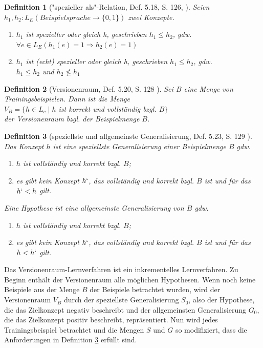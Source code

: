 \documentclass[a4paper, 11pt]{book}
\newtheorem{Def}{Definition }[section]
\begin{document}
{\begin{Def}["{}spezieller als"{}-Relation, Def. 5.18, S. 126, \cite{BKI08}]
	Seien $ h_1, h_2 : L_E (Beispielsprache \rightarrow \{0,1\}) $ zwei Konzepte.
	\begin{enumerate}
		\item $ h_1 $ ist spezieller oder gleich h, geschrieben $ h_1 \le h_2 $, gdw. \\
		$ \forall e \in L_E(h_1(e) = 1 \Rightarrow h_2(e) = 1) $
			\item $ h_1 $ ist (echt) spezieller oder gleich h, geschrieben $ h_1 \leq h_2 $, gdw. \\
		$ h_1 \leq h_2 $ und $ h_2 \not \le h_1 $
	\end{enumerate} 
\end{Def}
\begin{Def}[Versionenraum, Def. 5.20, S. 128 \cite{BKI08}]
	Sei $ B $ eine Menge von Trainingsbeispielen. Dann ist die Menge\\
	$ V_B = \{h \in L_ c \mid h $  ist korrekt und vollständig bzgl. $ B \} $\\
	der Versionenraum bzgl. der Beispielmenge $ B $.
\end{Def}
\begin{Def}[speziellste und allgemeinste Generalisierung, Def. 5.23, S. 129 \cite{BKI08}] \label{spezGen}
Das Konzept  $ h $ ist eine speziellste Generalisierung einer Beispielmenge $ B $ gdw.
\begin{enumerate}
	\item $ h $ ist vollständig und korrekt bzgl. $ B $;
	\item es gibt kein Konzept $ h` $, das vollständig und korrekt bzgl. $ B $ ist und für das $ h` <  h $ gilt.
\end{enumerate}
Eine Hypothese ist eine allgemeinste Generalisierung von $ B $ gdw.
\begin{enumerate}
	\item $ h $ ist vollständig und korrekt bzgl. $ B $;
	\item es gibt kein Konzept $ h` $, das vollständig und korrekt bzgl. $ B $ ist und für das $ h <  h` $ gilt.
\end{enumerate}
\end{Def}
Das Versionenraum-Lernverfahren ist ein inkrementelles Lernverfahren. Zu Beginn enthält der Versionenraum alle möglichen Hypothesen. Wenn noch keine Beispiele aus der Menge $ B $ der Beispiele betrachtet wurden, wird der Versionenraum $ V_B $ durch der speziellste Generalisierung $ S_0 $, also der Hypothese, die das Zielkonzept negativ beschreibt und der allgemeinsten Generalisierung $ G_0 $, die das Zielkonzept positiv beschreibt, repräsentiert. Nun wird jedes Trainingsbeispiel betrachtet und die Mengen $ S $ und $ G $ so modifiziert, dass die Anforderungen in Definition \ref{spezGen} erfüllt sind.


}
\end{document}
